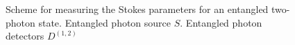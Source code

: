 \begin{figure}
\centering


\caption{Scheme for measuring the Stokes parameters for an entangled
  two-photon state. Entangled photon source $S$.
  Entangled photon detectors $D^{(1,2)}$}
\label{figEntangMes}
\end{figure}